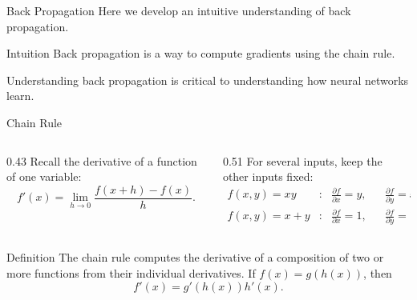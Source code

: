 \documentclass[aspectratio=169]{beamer}
\begin{document}
\begin{frame}{Back Propagation}
  Here we develop an intuitive understanding of back propagation.

  \begin{block}{Intuition}
    Back propagation is a way to compute gradients using the chain rule.
  \end{block}

  Understanding back propagation is critical to understanding how neural
  networks learn.
\end{frame}

\begin{frame}{Chain Rule}
  \small
  \begin{columns}[T]
    \begin{column}{0.43\textwidth}
      Recall the derivative of a function of one variable:
      \begin{equation*}
        f'(x)
        =
        \lim_{h \to 0}
        \frac{f(x+h)-f(x)}{h}.
      \end{equation*}
    \end{column}
    \begin{column}{0.51\textwidth}
      For several inputs, keep the other inputs fixed:
      \begin{align*}
        f(x,y)=xy
          &:& \frac{\partial f}{\partial x}=y,
          && \frac{\partial f}{\partial y}=x, \\
        f(x,y)=x+y
          &:& \frac{\partial f}{\partial x}=1,
          && \frac{\partial f}{\partial y}=1.
      \end{align*}
    \end{column}
  \end{columns}

  \begin{block}{Definition}
    The chain rule computes the derivative of a composition of two or more
    functions from their individual derivatives. If $f(x)=g(h(x))$, then
    \begin{equation*}
      f'(x)=g'(h(x))h'(x).
    \end{equation*}
  \end{block}
\end{frame}
\end{document}
